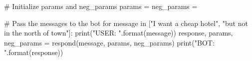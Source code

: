 # Initialize params and neg_params
params = {}
neg_params = {}

# Pass the messages to the bot
for message in ["I want a cheap hotel", "but not in the north of town"]:
    print("USER: {}".format(message))
    response, params, neg_params = respond(message, params, neg_params)
    print("BOT: {}".format(response))


